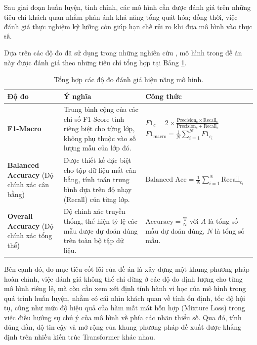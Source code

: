 Sau giai đoạn huấn luyện, tinh chỉnh, các mô hình cần được đánh giá trên những tiêu chí khách quan nhằm phản ánh khả năng tổng quát hóa; đồng thời, việc đánh giá thực nghiệm kỹ lưỡng còn giúp hạn chế rủi ro khi đưa mô hình vào thực tế.

Dựa trên các độ đo đã sử dụng trong những nghiên cứu \parencite{demszky2020goemotions, hung2026vigoemotions}, mô hình trong đề án này được đánh giá theo những tiêu chí tổng hợp tại Bảng \ref{tab:eval_metrics}.

\begin{table}[htbp]
    \centering
    \renewcommand{\arraystretch}{2.2}
    \caption{Tổng hợp các độ đo đánh giá hiệu năng mô hình.}
    \label{tab:eval_metrics}
    \begin{tabular}{|p{3.5cm}|p{5.5cm}|p{6cm}|}
        \hline
        \textbf{Độ đo} & \textbf{Ý nghĩa} & \textbf{Công thức} \\
        \hline
        \textbf{F1-Macro} &
        Trung bình cộng của các chỉ số F1-Score tính riêng biệt cho từng lớp, không phụ thuộc vào số lượng mẫu của lớp đó. &
        $\displaystyle F1_c = 2 \times \frac{\text{Precision}_c \times \text{Recall}_c}{\text{Precision}_c + \text{Recall}_c}$ \newline
        $\displaystyle F1_{\text{macro}} = \frac{1}{N} \sum_{i=1}^{N} F1_{c_i}$ \\
        \hline
        \textbf{Balanced Accuracy} \newline (Độ chính xác cân bằng) &
        Được thiết kế đặc biệt cho tập dữ liệu mất cân bằng, tính toán trung bình dựa trên độ nhạy (Recall) của từng lớp. &
        $\displaystyle \text{Balanced Acc} = \frac{1}{N} \sum_{i=1}^{N} \text{Recall}_{c_i}$ \\
        \hline
        \textbf{Overall Accuracy} \newline (Độ chính xác tổng thể) &
        Độ chính xác truyền thống, thể hiện tỷ lệ các mẫu được dự đoán đúng trên toàn bộ tập dữ liệu. &
        $\displaystyle \text{Accuracy} = \frac{\text{T}}{\text{N}}$ với $A$ là tổng số mẫu dự đoán đúng, $N$ là tổng số mẫu.\\
        \hline
    \end{tabular}
\end{table}

Bên cạnh đó, do mục tiêu cốt lõi của đề án là xây dựng một khung phương pháp hoàn chỉnh, việc đánh giá không thể chỉ dừng ở các độ đo định lượng cho từng mô hình riêng lẻ, mà còn cần xem xét định tính hành vi học của mô hình trong quá trình huấn luyện, nhằm có cái nhìn khách quan về tính ổn định, tốc độ hội tụ, cũng như mức độ hiệu quả của hàm mất mát hỗn hợp (Mixture Loss) trong việc điều hướng sự chú ý của mô hình về phía các nhãn thiểu số. Qua đó, tính đúng đắn, độ tin cậy và mở rộng của khung phương pháp đề xuất được khẳng định trên nhiều kiến trúc Transformer khác nhau.
